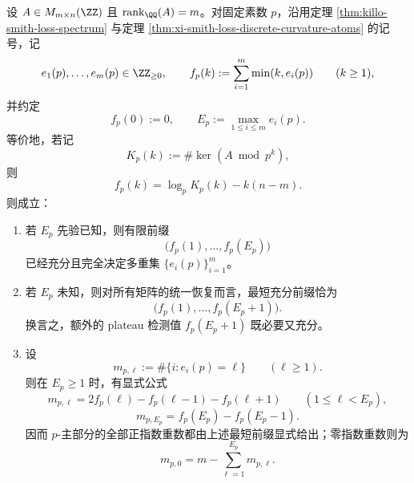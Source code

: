 \begin{theorem}\label{thm:xi-smith-p-kernel-shortest-sufficient-prefix}
设 \(A\in M_{m\times n}(\ZZ)\) 且 \(\operatorname{rank}_{\QQ}(A)=m\)。对固定素数 \(p\)，沿用定理 \ref{thm:killo-smith-loss-spectrum} 与定理 \ref{thm:xi-smith-loss-discrete-curvature-atoms} 的记号，记
\[
e_1(p),\dots,e_m(p)\in \ZZ_{\ge 0},
\qquad
f_p(k):=\sum_{i=1}^{m}\min(k,e_i(p))
\qquad(k\ge 1),
\]
并约定
\[
f_p(0):=0,
\qquad
E_p:=\max_{1\le i\le m}e_i(p).
\]
等价地，若记
\[
K_p(k):=\#\ker(A\bmod p^k),
\]
则
\[
f_p(k)=\log_p K_p(k)-k(n-m).
\]
则成立：
\begin{enumerate}
  \item 若 \(E_p\) 先验已知，则有限前缀
  \[
  \bigl(f_p(1),\dots,f_p(E_p)\bigr)
  \]
  已经充分且完全决定多重集 \(\{e_i(p)\}_{i=1}^{m}\)。
  \item 若 \(E_p\) 未知，则对所有矩阵的统一恢复而言，最短充分前缀恰为
  \[
  \bigl(f_p(1),\dots,f_p(E_p+1)\bigr).
  \]
  换言之，额外的 plateau 检测值 \(f_p(E_p+1)\) 既必要又充分。
  \item 设
  \[
  m_{p,\ell}:=\#\{i:e_i(p)=\ell\}
  \qquad(\ell\ge 1).
  \]
  则在 \(E_p\ge 1\) 时，有显式公式
  \[
  m_{p,\ell}
  =
  2f_p(\ell)-f_p(\ell-1)-f_p(\ell+1)
  \qquad(1\le \ell<E_p),
  \]
  \[
  m_{p,E_p}=f_p(E_p)-f_p(E_p-1).
  \]
  因而 \(p\)-主部分的全部正指数重数都由上述最短前缀显式给出；零指数重数则为
  \[
  m_{p,0}=m-\sum_{\ell=1}^{E_p}m_{p,\ell}.
  \]
\end{enumerate}
\end{theorem}
